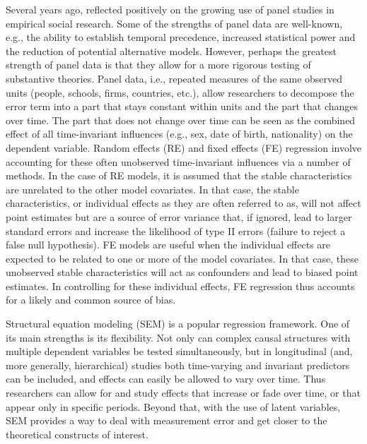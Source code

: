 \documentclass[]{interact}
\theoremstyle{plain}%
\theoremstyle{definition}
\theoremstyle{remark}
\begin{document}
Several years ago, \citet{Curran2011} reflected positively on the
growing use of panel studies in empirical social research. Some of the
strengths of panel data are well-known, e.g., the ability to establish
temporal precedence, increased statistical power and the reduction of
potential alternative models. However, perhaps the greatest strength of
panel data is that they allow for a more rigorous testing of substantive
theories. Panel data, i.e., repeated measures of the same observed units
(people, schools, firms, countries, etc.), allow researchers to
decompose the error term into a part that stays constant within units
and the part that changes over time. The part that does not change over
time can be seen as the combined effect of all time-invariant influences
(e.g., sex, date of birth, nationality) on the dependent variable.
Random effects (RE) and fixed effects (FE) regression involve accounting
for these often unobserved time-invariant influences via a number of
methods. In the case of RE models, it is assumed that the stable
characteristics are unrelated to the other model covariates. In that
case, the stable characteristics, or individual effects as they are
often referred to as, will not affect point estimates but are a source
of error variance that, if ignored, lead to larger standard errors and
increase the likelihood of type II errors (failure to reject a false
null hypothesis). FE models are useful when the individual effects are
expected to be related to one or more of the model covariates. In that
case, these unobserved stable characteristics will act as confounders
and lead to biased point estimates. In controlling for these individual
effects, FE regression thus accounts for a likely and common source of
bias.

Structural equation modeling (SEM) is a popular regression framework.
One of its main strengths is its flexibility. Not only can complex
causal structures with multiple dependent variables be tested
simultaneously, but in longitudinal (and, more generally, hierarchical)
studies both time-varying and invariant predictors can be included, and
effects can easily be allowed to vary over time. Thus researchers can
allow for and study effects that increase or fade over time, or that
appear only in specific periods. Beyond that, with the use of latent
variables, SEM provides a way to deal with measurement error and get
closer to the theoretical constructs of interest.
\end{document}
